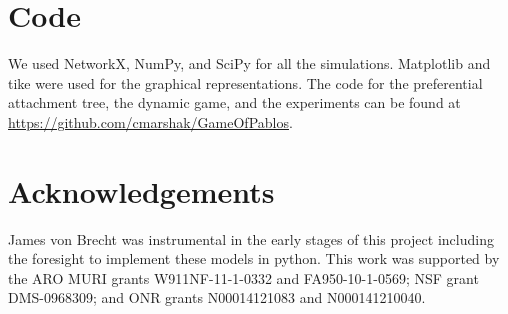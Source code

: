 \documentclass[%
 reprint,
 amsmath,amssymb,
 aps,
]{revtex4-1}
\theoremstyle{plain}
\theoremstyle{definition}
\begin{document}
 \section{Code}
 
 We used NetworkX, NumPy, and SciPy for all the simulations.  Matplotlib and tike were used for the graphical representations.  The code for the preferential attachment tree, the dynamic game, and the experiments can be found at \url{https://github.com/cmarshak/GameOfPablos}.
 
\section*{Acknowledgements}
James von Brecht was instrumental in the early stages of this project including the foresight to implement these models in python.  This work was supported by the ARO MURI grants W911NF-11-1-0332 and FA950-10-1-0569; NSF grant DMS-0968309; and ONR grants N00014121083 and N000141210040.





\end{document}
